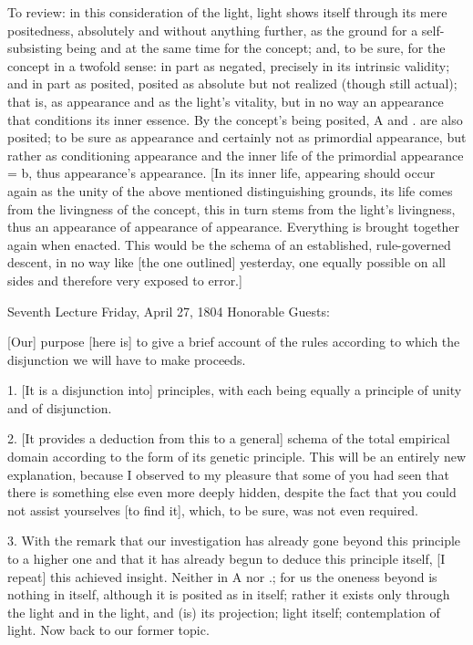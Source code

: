 To review: in this consideration of the light,
light shows itself through its mere positedness,
absolutely and without anything further,
as the ground for a self-subsisting being
and at the same time for the concept;
and, to be sure, for the concept in a twofold sense:
in part as negated, precisely in its intrinsic validity;
and in part as posited, posited as absolute
but not realized (though still actual);
that is, as appearance and as the light's vitality,
but in no way an appearance that conditions its inner essence.
By the concept's being posited,
A and . are also posited;
to be sure as appearance
and certainly not as primordial appearance,
but rather as conditioning appearance
and the inner life of the primordial appearance = b,
thus appearance's appearance.
[In its inner life,
appearing should occur again as
the unity of the above mentioned distinguishing grounds,
its life comes from the livingness of the concept,
this in turn stems from the light's livingness,
thus an appearance of appearance of appearance.
Everything is brought together again when enacted.
This would be the schema of
an established, rule-governed descent,
in no way like [the one outlined] yesterday,
one equally possible on all sides
and therefore very exposed to error.]

Seventh Lecture
Friday, April 27, 1804
Honorable Guests:

[Our] purpose [here is] to give a brief account of
the rules according to which the disjunction
we will have to make proceeds.

1. [It is a disjunction into] principles,
with each being equally a principle
of unity and of disjunction.

2. [It provides a deduction from this to a general]
schema of the total empirical domain
according to the form of its genetic principle.
This will be an entirely new explanation,
because I observed to my pleasure that
some of you had seen that there is
something else even more deeply hidden,
despite the fact that you could not
assist yourselves [to find it],
which, to be sure, was not even required.

3. With the remark that our investigation has
already gone beyond this principle to a higher one
and that it has already begun to deduce this principle itself,
[I repeat] this achieved insight.
Neither in A nor .;
for us the oneness beyond is nothing in itself,
although it is posited as in itself;
rather it exists only through the light
and in the light, and (is) its projection;
light itself; contemplation of light.
Now back to our former topic.

